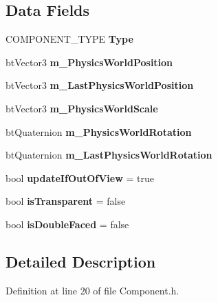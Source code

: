 \subsection*{Data Fields}
\begin{DoxyCompactItemize}
\item 
C\+O\+M\+P\+O\+N\+E\+N\+T\+\_\+\+T\+Y\+PE {\bfseries Type}\hypertarget{class_component_1_1_component_af4dec3a51b9df784040cb5cd809d79fe}{}\label{class_component_1_1_component_af4dec3a51b9df784040cb5cd809d79fe}

\item 
bt\+Vector3 {\bfseries m\+\_\+\+Physics\+World\+Position}\hypertarget{class_component_1_1_component_a052f87b10a8099a7c5d1c177a13056df}{}\label{class_component_1_1_component_a052f87b10a8099a7c5d1c177a13056df}

\item 
bt\+Vector3 {\bfseries m\+\_\+\+Last\+Physics\+World\+Position}\hypertarget{class_component_1_1_component_a63bb972ef698fe609770899f252ccc53}{}\label{class_component_1_1_component_a63bb972ef698fe609770899f252ccc53}

\item 
bt\+Vector3 {\bfseries m\+\_\+\+Physics\+World\+Scale}\hypertarget{class_component_1_1_component_ad533f66011b8562f55af6ae4b56e374b}{}\label{class_component_1_1_component_ad533f66011b8562f55af6ae4b56e374b}

\item 
bt\+Quaternion {\bfseries m\+\_\+\+Physics\+World\+Rotation}\hypertarget{class_component_1_1_component_a7fefa7380768c1b96b67d65410cb0d90}{}\label{class_component_1_1_component_a7fefa7380768c1b96b67d65410cb0d90}

\item 
bt\+Quaternion {\bfseries m\+\_\+\+Last\+Physics\+World\+Rotation}\hypertarget{class_component_1_1_component_a4d549befaca3703195f7328791206770}{}\label{class_component_1_1_component_a4d549befaca3703195f7328791206770}

\item 
bool {\bfseries update\+If\+Out\+Of\+View} = true\hypertarget{class_component_1_1_component_a0a49f61f8df325e37d18972ef9efab7c}{}\label{class_component_1_1_component_a0a49f61f8df325e37d18972ef9efab7c}

\item 
bool {\bfseries is\+Transparent} = false\hypertarget{class_component_1_1_component_ac8579c1969e9b0f53366b5521dd9d89b}{}\label{class_component_1_1_component_ac8579c1969e9b0f53366b5521dd9d89b}

\item 
bool {\bfseries is\+Double\+Faced} = false\hypertarget{class_component_1_1_component_a9b9c018cd89f4f31d49232f4e47caf3e}{}\label{class_component_1_1_component_a9b9c018cd89f4f31d49232f4e47caf3e}

\end{DoxyCompactItemize}


\subsection{Detailed Description}


Definition at line 20 of file Component.\+h.

